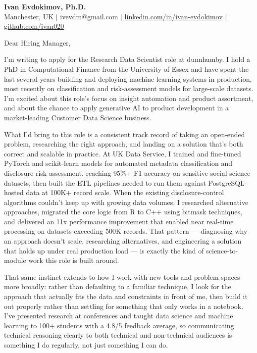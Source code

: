 \documentclass[11pt]{letter}
\begin{document}
\begin{center}
{\Large \textbf{Ivan Evdokimov, Ph.D.}}\\[4pt]
{\small Manchester, UK \; $|$ \; ivevdm@gmail.com \; $|$ \; \href{https://linkedin.com/in/ivan-evdokimov}{linkedin.com/in/ivan-evdokimov} \; $|$ \; \href{https://github.com/ivan020}{github.com/ivan020}}
\end{center}

\vspace{10pt}

Dear Hiring Manager,

I'm writing to apply for the Research Data Scientist role at dunnhumby. I hold a PhD in Computational Finance from the University of Essex and have spent the last several years building and deploying machine learning systems in production, most recently on classification and risk-assessment models for large-scale datasets. I'm excited about this role's focus on insight automation and product assortment, and about the chance to apply generative AI to product development in a market-leading Customer Data Science business.

What I'd bring to this role is a consistent track record of taking an open-ended problem, researching the right approach, and landing on a solution that's both correct and scalable in practice. At UK Data Service, I trained and fine-tuned PyTorch and scikit-learn models for automated metadata classification and disclosure risk assessment, reaching 95\%+ F1 accuracy on sensitive social science datasets, then built the ETL pipelines needed to run them against PostgreSQL-hosted data at 100K+ record scale. When the existing disclosure-control algorithms couldn't keep up with growing data volumes, I researched alternative approaches, migrated the core logic from R to C++ using bitmask techniques, and delivered an 11x performance improvement that enabled near real-time processing on datasets exceeding 500K records. That pattern --- diagnosing why an approach doesn't scale, researching alternatives, and engineering a solution that holds up under real production load --- is exactly the kind of science-to-module work this role is built around.

That same instinct extends to how I work with new tools and problem spaces more broadly: rather than defaulting to a familiar technique, I look for the approach that actually fits the data and constraints in front of me, then build it out properly rather than settling for something that only works in a notebook. I've presented research at conferences and taught data science and machine learning to 100+ students with a 4.8/5 feedback average, so communicating technical reasoning clearly to both technical and non-technical audiences is something I do regularly, not just something I can do.
\end{document}
